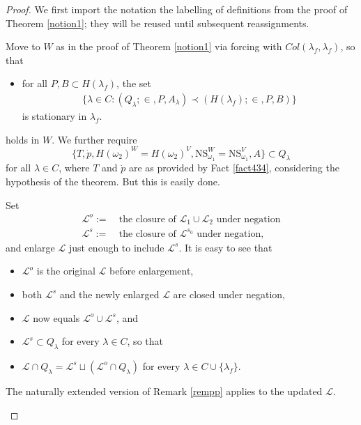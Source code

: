 \documentclass[12pt]{article}
\numberwithin{equation}{section}
\begin{document}
\begin{proof}
We first import the notation the labelling of definitions from the proof of Theorem \ref{notion1}; they will be reused until subsequent reassignments. 

Move to $W$ as in the proof of Theorem \ref{notion1} via forcing with $Col(\lambda_f, \lambda_f)$, so that 
\begin{itemize}[label=($\diamond$)]
    \item for all $P, B \subset H(\lambda_f)$, the set
    \begin{align*}
        \{\lambda \in C : (Q_{\lambda}; \in, P, A_{\lambda}) \prec (H(\lambda_f); \in, P, B)\}
    \end{align*}
    is stationary in $\lambda_f$.
\end{itemize}
holds in $W$. We further require 
\begin{equation*}
    \{T, \dot{p}, H(\omega_2)^W = H(\omega_2)^V, \mathrm{NS}_{\omega_1}^W = \mathrm{NS}_{\omega_1}^V, A\} \subset Q_{\lambda}
\end{equation*}
for all $\lambda \in C$, where $T$ and $\dot{p}$ are as provided by Fact \ref{fact434}, considering the hypothesis of the theorem. But this is easily done. 

Set
\begin{align*}
    \mathcal{L}^o := \ & \text{the closure of } \mathcal{L}_1 \cup \mathcal{L}_2 \text{ under negation} \\
    \mathcal{L}^s := \ & \text{the closure of } \mathcal{L}^{s_0} \text{ under negation},
\end{align*}
and enlarge $\mathcal{L}$ just enough to include $\mathcal{L}^s$. It is easy to see that
\begin{itemize}
    \item $\mathcal{L}^o$ is the original $\mathcal{L}$ before enlargement,
    \item both $\mathcal{L}^s$ and the newly enlarged $\mathcal{L}$ are closed under negation, 
    \item $\mathcal{L}$ now equals $\mathcal{L}^o \cup \mathcal{L}^s$, and
    \item $\mathcal{L}^s \subset Q_{\lambda}$ for every $\lambda \in C$, so that
    \item $\mathcal{L} \cap Q_{\lambda} = \mathcal{L}^s \sqcup (\mathcal{L}^o \cap Q_{\lambda})$ for every $\lambda \in C \cup \{\lambda_f\}$.
\end{itemize}

\begin{rem}\label{rempp2}
The naturally extended version of Remark \ref{rempp} applies to the updated $\mathcal{L}$.
\end{rem}


\end{proof}
\end{document}
